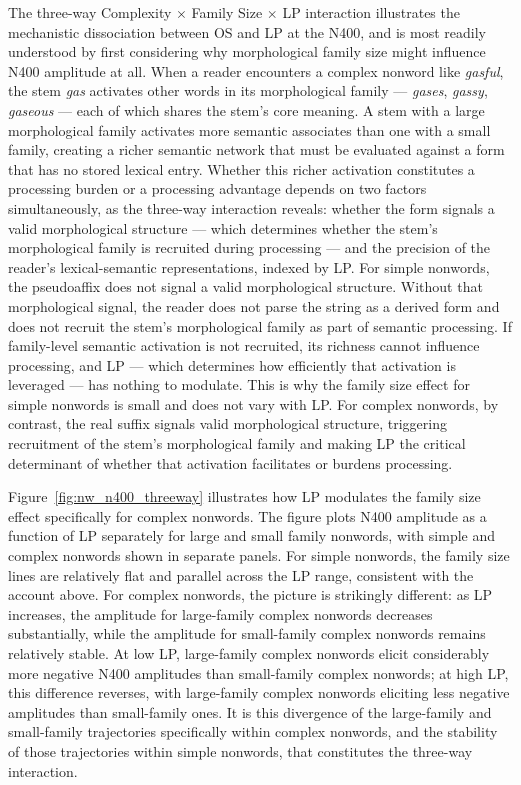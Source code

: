 \documentclass[utf8]{FrontiersinHarvard} %
\begin{document}
	The three-way Complexity $\times$ Family Size $\times$ LP interaction illustrates the mechanistic dissociation between OS and LP at the N400, and is most readily understood by first considering why morphological family size might influence N400 amplitude at all. When a reader encounters a complex nonword like \textit{gasful}, the stem \textit{gas} activates other words in its morphological family --- \textit{gases}, \textit{gassy}, \textit{gaseous} --- each of which shares the stem's core meaning. A stem with a large morphological family activates more semantic associates than one with a small family, creating a richer semantic network that must be evaluated against a form that has no stored lexical entry. Whether this richer activation constitutes a processing burden or a processing advantage depends on two factors simultaneously, as the three-way interaction reveals: whether the form signals a valid morphological structure --- which determines whether the stem's morphological family is recruited during processing --- and the precision of the reader's lexical-semantic representations, indexed by LP. For simple nonwords, the pseudoaffix does not signal a valid morphological structure. Without that morphological signal, the reader does not parse the string as a derived form and does not recruit the stem's morphological family as part of semantic processing. If family-level semantic activation is not recruited, its richness cannot influence processing, and LP --- which determines how efficiently that activation is leveraged --- has nothing to modulate. This is why the family size effect for simple nonwords is small and does not vary with LP. For complex nonwords, by contrast, the real suffix signals valid morphological structure, triggering recruitment of the stem's morphological family and making LP the critical determinant of whether that activation facilitates or burdens processing.
	
	Figure~\ref{fig:nw_n400_threeway} illustrates how LP modulates the family size effect specifically for complex nonwords. The figure plots N400 amplitude as a function of LP separately for large and small family nonwords, with simple and complex nonwords shown in separate panels. For simple nonwords, the family size lines are relatively flat and parallel across the LP range, consistent with the account above. For complex nonwords, the picture is strikingly different: as LP increases, the amplitude for large-family complex nonwords decreases substantially, while the amplitude for small-family complex nonwords remains relatively stable. At low LP, large-family complex nonwords elicit considerably more negative N400 amplitudes than small-family complex nonwords; at high LP, this difference reverses, with large-family complex nonwords eliciting less negative amplitudes than small-family ones. It is this divergence of the large-family and small-family trajectories specifically within complex nonwords, and the stability of those trajectories within simple nonwords, that constitutes the three-way interaction.
	
\end{document}
